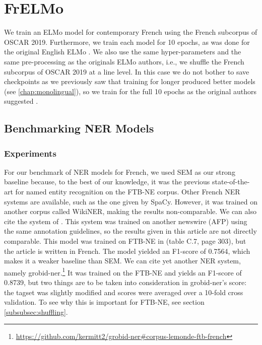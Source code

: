 \section{FrELMo}

We train an ELMo model for contemporary French using the French subcorpus of OSCAR 2019. Furthermore, we train each model for 10 epochs, as was done for the original English ELMo \citep{peters-etal-2018-deep}. We also use the same hyper-parameters and the same pre-processing as the originals ELMo authors, i.e., we shuffle the French subcorpus of OSCAR 2019 at a line level. In this case we do not bother to save checkpoints as we previously saw that training for longer produced better models (see \ref{chap:monolingual}), so we train for the full 10 epochs as the original authors suggested \citep{peters-etal-2018-deep}.

\subsection{Benchmarking NER Models}\label{subsec:benchmarking-ner-models}

\subsubsection{Experiments}
For our benchmark of NER models for French, we used SEM \citep{dupont-2017-exploration} as our strong baseline because, to the best of our knowledge, it was the previous state-of-the-art for named entity recognition on the FTB-NE corpus. Other French NER systems are available, such as the one given by SpaCy. However, it was trained on another corpus called WikiNER, making the results non-comparable. We can also cite the system of \citep{stern-etal-2012-joint}. This system was trained on another newswire (AFP) using the same annotation guidelines, so the results given in this article are not directly comparable. This model was trained on FTB-NE in \citet{stern-2013-identification} (table C.7, page 303), but the article is written in French. The model yielded an F1-score of 0.7564, which makes it a weaker baseline than SEM. We can cite yet another NER system, namely grobid-ner.\footnote{\url{https://github.com/kermitt2/grobid-ner\#corpus-lemonde-ftb-french}} It was trained on the FTB-NE and yields an F1-score of 0.8739, but two things are to be taken into consideration in grobid-ner's score: the tagset was slightly modified and scores were averaged over a 10-fold cross validation. To see why this is important for FTB-NE, see section \ref{subsubsec:shuffling}.


